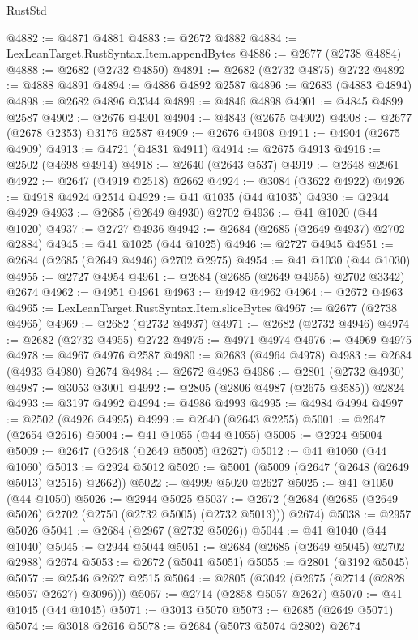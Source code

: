 \begin{lexlean}{RustStd}
\begin{coremodule}
@4882 := @4871 @4881
@4883 := @2672 @4882
@4884 := LexLeanTarget.RustSyntax.Item.appendBytes
@4886 := @2677 (@2738 @4884)
@4888 := @2682 (@2732 @4850)
@4891 := @2682 (@2732 @4875) @2722
@4892 := @4888 @4891
@4894 := @4886 @4892 @2587
@4896 := @2683 (@4883 @4894)
@4898 := @2682 @4896 @3344
@4899 := @4846 @4898
@4901 := @4845 @4899 @2587
@4902 := @2676 @4901
@4904 := @4843 (@2675 @4902)
@4908 := @2677 (@2678 @2353) @3176 @2587
@4909 := @2676 @4908
@4911 := @4904 (@2675 @4909)
@4913 := @4721 (@4831 @4911)
@4914 := @2675 @4913
@4916 := @2502 (@4698 @4914)
@4918 := @2640 (@2643 @537)
@4919 := @2648 @2961
@4922 := @2647 (@4919 @2518) @2662
@4924 := @3084 (@3622 @4922)
@4926 := @4918 @4924 @2514
@4929 := @41 @1035 (@44 @1035)
@4930 := @2944 @4929
@4933 := @2685 (@2649 @4930) @2702
@4936 := @41 @1020 (@44 @1020)
@4937 := @2727 @4936
@4942 := @2684 (@2685 (@2649 @4937) @2702 @2884)
@4945 := @41 @1025 (@44 @1025)
@4946 := @2727 @4945
@4951 := @2684 (@2685 (@2649 @4946) @2702 @2975)
@4954 := @41 @1030 (@44 @1030)
@4955 := @2727 @4954
@4961 := @2684 (@2685 (@2649 @4955) @2702 @3342) @2674
@4962 := @4951 @4961
@4963 := @4942 @4962
@4964 := @2672 @4963
@4965 := LexLeanTarget.RustSyntax.Item.sliceBytes
@4967 := @2677 (@2738 @4965)
@4969 := @2682 (@2732 @4937)
@4971 := @2682 (@2732 @4946)
@4974 := @2682 (@2732 @4955) @2722
@4975 := @4971 @4974
@4976 := @4969 @4975
@4978 := @4967 @4976 @2587
@4980 := @2683 (@4964 @4978)
@4983 := @2684 (@4933 @4980) @2674
@4984 := @2672 @4983
@4986 := @2801 (@2732 @4930)
@4987 := @3053 @3001
@4992 := @2805 (@2806 @4987 (@2675 @3585)) @2824
@4993 := @3197 @4992
@4994 := @4986 @4993
@4995 := @4984 @4994
@4997 := @2502 (@4926 @4995)
@4999 := @2640 (@2643 @2255)
@5001 := @2647 (@2654 @2616)
@5004 := @41 @1055 (@44 @1055)
@5005 := @2924 @5004
@5009 := @2647 (@2648 (@2649 @5005) @2627)
@5012 := @41 @1060 (@44 @1060)
@5013 := @2924 @5012
@5020 := @5001 (@5009 (@2647 (@2648 (@2649 @5013) @2515) @2662))
@5022 := @4999 @5020 @2627
@5025 := @41 @1050 (@44 @1050)
@5026 := @2944 @5025
@5037 := @2672 (@2684 (@2685 (@2649 @5026) @2702 (@2750 (@2732 @5005) (@2732 @5013))) @2674)
@5038 := @2957 @5026
@5041 := @2684 (@2967 (@2732 @5026))
@5044 := @41 @1040 (@44 @1040)
@5045 := @2944 @5044
@5051 := @2684 (@2685 (@2649 @5045) @2702 @2988) @2674
@5053 := @2672 (@5041 @5051)
@5055 := @2801 (@3192 @5045)
@5057 := @2546 @2627 @2515
@5064 := @2805 (@3042 (@2675 (@2714 (@2828 @5057 @2627) @3096)))
@5067 := @2714 (@2858 @5057 @2627)
@5070 := @41 @1045 (@44 @1045)
@5071 := @3013 @5070
@5073 := @2685 (@2649 @5071)
@5074 := @3018 @2616
@5078 := @2684 (@5073 @5074 @2802) @2674

\end{coremodule}
\end{lexlean}
